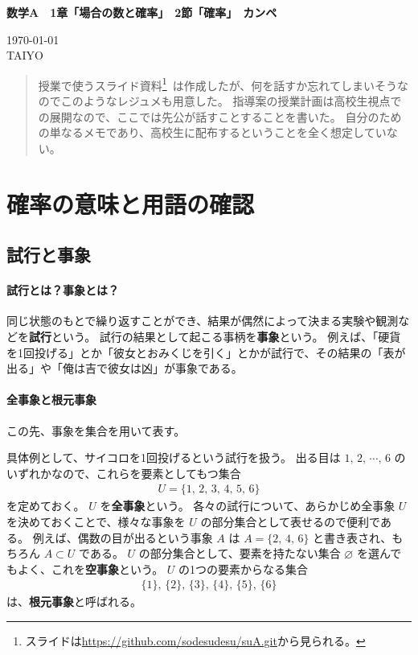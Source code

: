 \documentclass[12pt]{ltjsarticle}\usepackage{ifthen}\newcounter{enlarge}\setcounter{enlarge}{1}
\newcommand{\LS}[2]{\ifthenelse{\value{enlarge}=2 \OR \value{enlarge}=3}{#1}{#2}}
\newcommand{\LO}[1]{\LS{#1}{\relax}}
\begin{document}
{\Large%
\noindent
\textbf{%
数学A　1章「場合の数と確率」　2節「確率」　カンペ
\LO{\\ \color{teal} 〈拡大版〉}}
}

\begin{flushleft}
\today \\
TAIYO
\end{flushleft}

\begin{quotation}
授業で使うスライド資料\footnote{%
スライドは\url{https://github.com/sodesudesu/suA.git}から見られる。
}\
は作成したが、何を話すか忘れてしまいそうなのでこのようなレジュメも用意した。
指導案の授業計画は高校生視点での展開なので、ここでは先公が話すことすることを書いた。
自分のための単なるメモであり、高校生に配布するということを全く想定していない。
\end{quotation}

\section{確率の意味と用語の確認}

\subsection{試行と事象} \label{ss:1.1}

\paragraph{試行とは？事象とは？}

同じ状態のもとで繰り返すことができ、結果が偶然によって決まる実験や観測などを\textbf{試行}という。
試行の結果として起こる事柄を\textbf{事象}という。
例えば、「硬貨を1回投げる」とか「彼女とおみくじを引く」とかが試行で、その結果の「表が出る」や「俺は吉で彼女は凶」が事象である。

\paragraph{全事象と根元事象}

この先、事象を集合を用いて表す。

具体例として、サイコロを1回投げるという試行を扱う。
出る目は $1,\, 2,\, \cdots ,\, 6$ のいずれかなので、これらを要素としてもつ集合
\begin{align}
  U = \{ 1,\, 2,\, 3,\, 4,\, 5,\, 6 \} \label{eq:1.1}
\end{align}
を定めておく。
$U$ を\textbf{全事象}という。
各々の試行について、あらかじめ全事象 $U$ を決めておくことで、様々な事象を $U$ の部分集合として表せるので便利である。
例えば、偶数の目が出るという事象 $A$ は $A = \{ 2,\, 4,\, 6 \}$ と書き表され、もちろん $A \subset U$ である。
$U$ の部分集合として、要素を持たない集合 $\varnothing$ を選んでもよく、これを\textbf{空事象}という。
$U$ の1つの要素からなる集合
\begin{align}
  \{ 1\},\, \{2\},\, \{3\},\, \{4\},\, \{5\},\, \{6\} \label{eq:1.2}
\end{align}
は、\textbf{根元事象}と呼ばれる。
\end{document}
